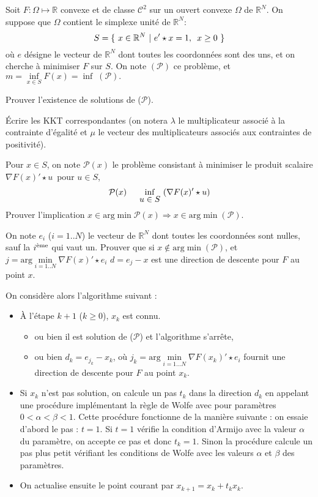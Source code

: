 \documentclass[12pt,a4paper,fleqn]{report}
\newcommand{\R}{\mathbb R}
\newcommand{\grad}{\nabla}
\renewcommand{\P}{\mathcal P}
\newcommand{\push}[1]{\rule{0pt}{0pt}\hspace{#1pt}}
\begin{document}
\begin{exercice}\label{exo}
Soit $F:\Omega\mapsto \R$ convexe et de classe $\mathcal C^2$ sur un ouvert convexe $\Omega$ de $\R^N$. On suppose que $\Omega$ contient le simplexe unit\'e de $\R^N$:
\[
S=\{\ x\in\R^N\ | \ e'\star x=1,\push{5} x\geq 0 \ \}
\]
o\`u $e$ d\'esigne le vecteur de $\R^N$ dont toutes les coordonn\'ees sont des \og uns\fg, et on cherche \`a minimiser $F$ sur $S$. On note $(\P)$ ce probl\`eme, et
$
m=\underset{x\in S}{\inf} F(x)= \inf\;(\P).
$
\begin{questions}
\item Prouver l'existence de solutions de ($\P$).
\item \'Ecrire les KKT correspondantes (on notera $\lambda$ le multiplicateur associ\'e \`a la contrainte d'\'egalit\'e et $\mu$ le vecteur des multiplicateurs associ\'es aux contraintes de positivit\'e).
\item Pour $x\in S$, on note $\P(x)$ le probl\`eme consistant \`a minimiser le produit scalaire $\grad F(x)'\star u $\, pour $u\in S$,
\[
\P(x)\push{15} \underset{\mbox{$u\in S$}}{\inf} \ (\grad F(x)'\star u)
\]
Prouver l'implication $x\in \mbox{arg} \min \P(x) \Rightarrow x\in \mbox{arg} \min (\P)$.
\item On note $e_i$ ($i=1..N$) le vecteur de $\R^N$ dont toutes les coordonn\'ees sont nulles, sauf la $i^{\mbox{\scriptsize \`eme}}$ qui vaut un. Prouver que si $x\not\in \mbox{arg} \min (\P)$, et $j=\mbox{arg} \underset{i=1..N}{\min} \grad F(x)'\star e_i$ $d=e_j-x$ est une direction de descente pour $F$ au point $x$.
\item On consid\`ere alors l'algorithme suivant :
\begin{itemize}
\item \`A l'\'etape $k+1$ ($k\geq 0$), $x_k$ est connu.
\begin{itemize}
\item ou bien il est solution de ($\P$) et l'algorithme s'arr\^ete,
\item ou bien $d_k=e_{j_k}-x_k$, o\`u $j_k=\mbox{arg} \underset{i=1\dots N}{\min} \grad F(x_k)'\star e_i$ fournit une direction de descente pour $F$ au point $x_k$.
\end{itemize}
\item Si $x_k$ n'est pas solution, on calcule un pas $t_k$ dans la direction $d_k$ en appelant une proc\'edure impl\'ementant la r\`egle de Wolfe avec pour param\`etres \mbox{$0<\alpha<\beta<1$}. Cette proc\'edure fonctionne de la mani\`ere suivante : on essaie d'abord le pas : $t=1$. Si $t=1$ v\'erifie la condition d'Armijo avec la valeur $\alpha$ du param\`etre, on accepte ce pas et donc $t_k=1$. Sinon la proc\'edure calcule un pas plus petit v\'erifiant les conditions de Wolfe avec les valeurs $\alpha$ et $\beta$ des param\`etres.
\item On actualise ensuite le point courant par $x_{k+1}=x_k +t_k x_k$.
\end{itemize}
\medskip


\end{questions}
\end{exercice}
\end{document}
